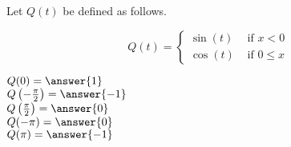 \documentclass{ximera}
\author{Lee Wayand}
\begin{document}
\begin{exercise}




Let $Q(t)$ be defined as follows.

\[
Q(t) = 
\begin{cases}
  \sin(t) & \text{ if }  x < 0 \\
  \cos(t) & \text{ if } 0 \leq x 
\end{cases}
\]



$Q(0) = \answer{1}$ \\


$Q\left( -\frac{\pi}{2} \right) = \answer{-1}$ \\


$Q\left( \frac{\pi}{2} \right) = \answer{0}$ \\


$Q(-\pi) = \answer{0}$ \\


$Q(\pi) = \answer{-1}$ \\




\end{exercise}
\end{document}
